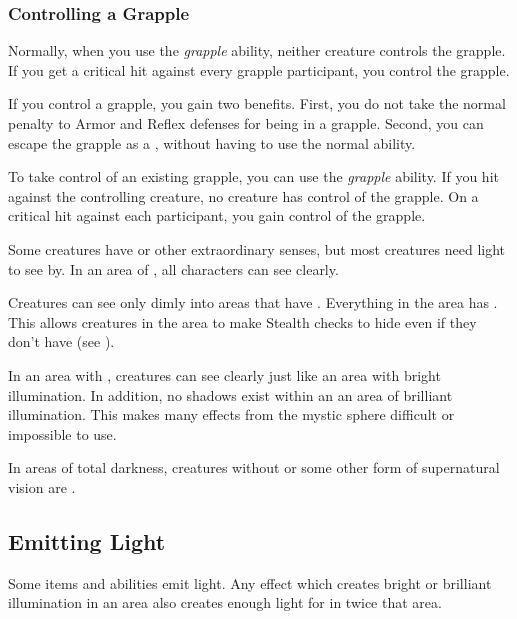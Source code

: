     \subsubsection{Controlling a Grapple}\label{Controlling a Grapple}
      Normally, when you use the \textit{grapple} ability, neither creature controls the grapple.
      If you get a critical hit against every grapple participant, you control the grapple.

      If you control a grapple, you gain two benefits.
      First, you do not take the normal  penalty to Armor and Reflex defenses for being in a grapple.
      Second, you can escape the grapple as a , without having to use the normal  ability.

      To take control of an existing grapple, you can use the \textit{grapple} ability.
      If you hit against the controlling creature, no creature has control of the grapple.
      On a critical hit against each participant, you gain control of the grapple.


  Some creatures have  or other extraordinary senses, but most creatures need light to see by.
  In an area of , all characters can see clearly.

  Creatures can see only dimly into areas that have .
  Everything in the area has .
  This allows creatures in the area to make Stealth checks to hide even if they don't have  (see ).

  In an area with , creatures can see clearly just like an area with bright illumination.
  In addition, no shadows exist within an an area of brilliant illumination.
  This makes many effects from the  mystic sphere difficult or impossible to use.

  In areas of total darkness, creatures without  or some other form of supernatural vision are \blinded.

  \subsection{Emitting Light}
    Some items and abilities emit light.
    Any effect which creates bright or brilliant illumination in an area also creates enough light for  in twice that area.

